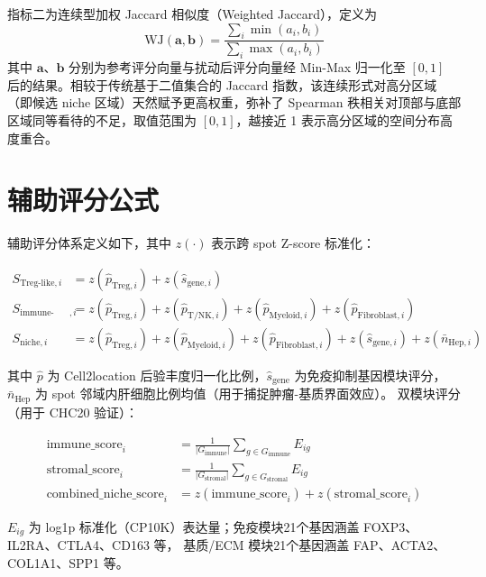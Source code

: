\documentclass[12pt, a4paper]{ctexart}
\begin{document}
指标二为连续型加权 Jaccard 相似度（Weighted Jaccard），定义为
\begin{equation}
\text{WJ}(\mathbf{a}, \mathbf{b}) = \frac{\sum_i \min(a_i, b_i)}{\sum_i \max(a_i, b_i)}
\label{eq:weighted_jaccard}
\end{equation}
其中 $\mathbf{a}$、$\mathbf{b}$ 分别为参考评分向量与扰动后评分向量经 Min-Max 归一化至 $[0,1]$ 后的结果。相较于传统基于二值集合的 Jaccard 指数，该连续形式对高分区域（即候选 niche 区域）天然赋予更高权重，弥补了 Spearman 秩相关对顶部与底部区域同等看待的不足，取值范围为 $[0, 1]$，越接近 1 表示高分区域的空间分布高度重合。

\section{辅助评分公式}
\label{app:scores}

辅助评分体系定义如下，其中 $z(\cdot)$ 表示跨 spot Z-score 标准化：

\begin{align}
S_{\text{Treg-like},i} &= z(\hat{p}_{\text{Treg},i}) + z(\hat{s}_{\text{gene},i}) \\
S_{\text{immune-stroma},i} &= z(\hat{p}_{\text{Treg},i}) + z(\hat{p}_{\text{T/NK},i}) + z(\hat{p}_{\text{Myeloid},i}) + z(\hat{p}_{\text{Fibroblast},i}) \\
S_{\text{niche},i} &= z(\hat{p}_{\text{Treg},i}) + z(\hat{p}_{\text{Myeloid},i}) + z(\hat{p}_{\text{Fibroblast},i}) + z(\hat{s}_{\text{gene},i}) + z(\bar{n}_{\text{Hep},i})
\end{align}

其中 $\hat{p}$ 为 Cell2location 后验丰度归一化比例，$\hat{s}_{\text{gene}}$ 为免疫抑制基因模块评分，
$\bar{n}_{\text{Hep}}$ 为 spot 邻域内肝细胞比例均值（用于捕捉肿瘤-基质界面效应）。
双模块评分（用于 CHC20 验证）：

\begin{align}
\text{immune\_score}_i &= \frac{1}{|G_{\text{immune}}|}\sum_{g \in G_{\text{immune}}} E_{ig} \\
\text{stromal\_score}_i &= \frac{1}{|G_{\text{stromal}}|}\sum_{g \in G_{\text{stromal}}} E_{ig} \\
\text{combined\_niche\_score}_i &= z(\text{immune\_score}_i) + z(\text{stromal\_score}_i)
\end{align}

$E_{ig}$ 为 log1p 标准化（CP10K）表达量；免疫模块21个基因涵盖 FOXP3、IL2RA、CTLA4、CD163 等，
基质/ECM 模块21个基因涵盖 FAP、ACTA2、COL1A1、SPP1 等。
\end{document}
